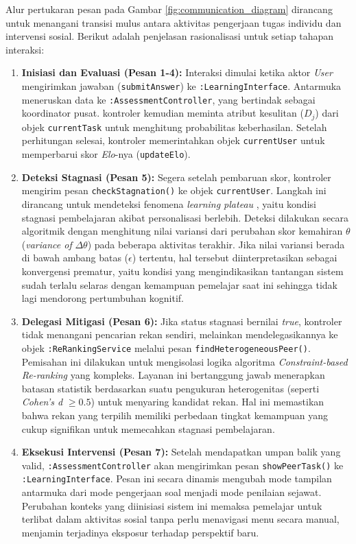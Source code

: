Alur pertukaran pesan pada Gambar \ref{fig:communication_diagram} dirancang untuk menangani transisi mulus antara aktivitas pengerjaan tugas individu dan intervensi sosial. Berikut adalah penjelasan rasionalisasi untuk setiap tahapan interaksi:

\begin{enumerate}
    \item \textbf{Inisiasi dan Evaluasi (Pesan 1-4):}
    Interaksi dimulai ketika aktor \textit{User} mengirimkan jawaban (\texttt{submitAnswer}) ke \texttt{:LearningInterface}. Antarmuka meneruskan data ke \texttt{:AssessmentController}, yang bertindak sebagai koordinator pusat. kontroler kemudian meminta atribut kesulitan ($D_j$) dari objek \texttt{currentTask} untuk menghitung probabilitas keberhasilan. Setelah perhitungan selesai, kontroler memerintahkan objek \texttt{currentUser} untuk memperbarui skor \textit{Elo}-nya (\texttt{updateElo}).
    
    \item \textbf{Deteksi Stagnasi (Pesan 5):}
    Segera setelah pembaruan skor, kontroler mengirim pesan \texttt{checkStagnation()} ke objek \texttt{currentUser}. 
    Langkah ini dirancang untuk mendeteksi fenomena \textit{learning plateau} \autocite{Halkiopoulos2024}, yaitu kondisi stagnasi pembelajaran akibat personalisasi berlebih. Deteksi dilakukan secara algoritmik dengan menghitung nilai variansi dari perubahan skor kemahiran $\theta$ (\textit{variance of} $\Delta\theta$) pada beberapa aktivitas terakhir. Jika nilai variansi berada di bawah ambang batas ($\epsilon$) tertentu, hal tersebut diinterpretasikan sebagai konvergensi prematur, yaitu kondisi yang mengindikasikan tantangan sistem sudah terlalu selaras dengan kemampuan pemelajar saat ini sehingga tidak lagi mendorong pertumbuhan kognitif.
    
    \item \textbf{Delegasi Mitigasi (Pesan 6):}
    Jika status stagnasi bernilai \textit{true}, kontroler tidak menangani pencarian rekan sendiri, melainkan mendelegasikannya ke objek \texttt{:ReRankingService} melalui pesan \texttt{findHeterogeneousPeer()}.
    Pemisahan ini dilakukan untuk mengisolasi logika algoritma \textit{Constraint-based Re-ranking} \autocite{DeBiasio2023} yang kompleks. Layanan ini bertanggung jawab menerapkan batasan statistik berdasarkan suatu pengukuran heterogenitas (seperti \textit{Cohen's d} $\geq 0.5$) untuk menyaring kandidat rekan. Hal ini memastikan bahwa rekan yang terpilih memiliki perbedaan tingkat kemampuan yang cukup signifikan untuk memecahkan stagnasi pembelajaran.
    
    \item \textbf{Eksekusi Intervensi (Pesan 7):}
    Setelah mendapatkan umpan balik yang valid, \texttt{:AssessmentController} akan mengirimkan pesan \texttt{showPeerTask()} ke \texttt{:LearningInterface}.
    Pesan ini secara dinamis mengubah mode tampilan antarmuka dari mode pengerjaan soal menjadi mode penilaian sejawat. Perubahan konteks yang diinisiasi sistem ini memaksa pemelajar untuk terlibat dalam aktivitas sosial tanpa perlu menavigasi menu secara manual, menjamin terjadinya eksposur terhadap perspektif baru.
\end{enumerate}

